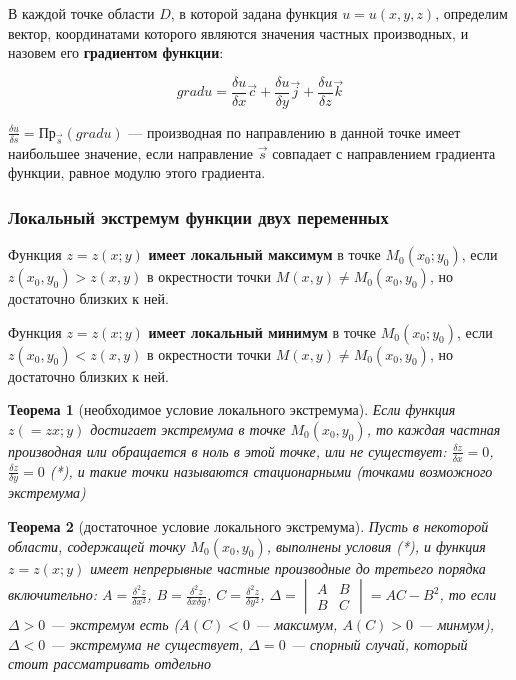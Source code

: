 \documentclass{article}
\newtheorem{theorem}{Теорема}
\begin{document}
В каждой точке области $D$, в которой задана функция $u = u(x, y, z)$, определим вектор, координатами которого являются значения частных производных, и назовем его \textbf{градиентом функции}:

$$grad u = \frac{\delta u}{\delta x} \overrightarrow{c} + \frac{\delta u}{\delta y} \overrightarrow{j} + \frac{\delta u}{\delta z} \overrightarrow{k} $$

$\frac{\delta u}{\delta s} = \text{Пр}_{\overrightarrow{s}} (grad u)$ — производная по направлению в данной точке имеет наибольшее значение, если направление $\overrightarrow{s}$ совпадает с направлением градиента функции, равное модулю этого градиента.

\subsubsection{Локальный экстремум функции двух переменных}

Функция $z = z(x; y)$ \textbf{имеет локальный максимум} в точке $M_0(x_0; y_0)$, если $z(x_0, y_0) > z(x, y)$ в окрестности точки $M(x, y) \ne M_0(x_0, y_0)$, но достаточно близких к ней.

Функция $z = z(x; y)$ \textbf{имеет локальный минимум} в точке $M_0(x_0; y_0)$, если $z(x_0, y_0) < z(x, y)$ в окрестности точки $M(x, y) \ne M_0(x_0, y_0)$, но достаточно близких к ней.

\begin{theorem}[необходимое условие локального экстремума]
    Если функция $z( = zx; y)$ достигает экстремума в точке $M_0(x_0, y_0)$, то каждая частная производная или обращается в ноль в этой точке, или не существует: $\frac{\delta z}{\delta x} = 0$, $\frac{\delta z}{\delta y} = 0$ (*), и такие точки называются стационарными (точками возможного экстремума)
\end{theorem}

\begin{theorem}[достаточное условие локального экстремума]
    Пусть в некоторой области, содержащей точку $M_0(x_0, y_0)$, выполнены условия (*), и функция $z = z(x; y)$ имеет непрерывные частные производные до третьего порядка включительно: $A = \frac{\delta^2 z}{\delta x^2}$, $B = \frac{\delta^2 z}{\delta x \delta y}$, $C = \frac{\delta^2 z}{\delta y^2}$, $\Delta = \begin{vmatrix}
        A & B \\
        B & C
    \end{vmatrix} = AC - B^2$, то если $\Delta > 0$ — экстремум есть ($A(C) < 0$ — максимум, $A(C) > 0$ — минмум), $\Delta < 0$ — экстремума не существует, $\Delta = 0$ — спорный случай, который стоит рассматривать отдельно
\end{theorem}
\end{document}
